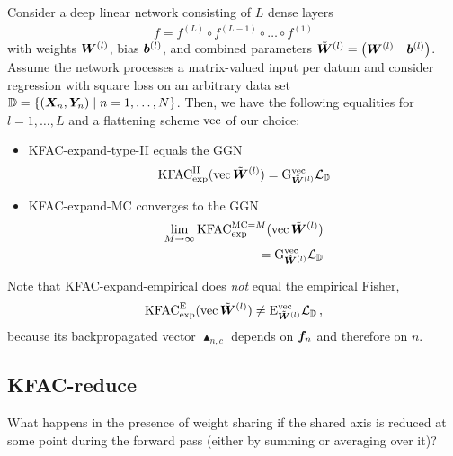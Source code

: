 \begin{test}
  Consider a deep linear network consisting of $L$ dense layers
  \begin{align*}
    f = f^{(L)} \circ f^{(L-1)} \circ \ldots \circ f^{(1)}
  \end{align*}
  with weights $\mW^{(l)}$, bias $\vb^{(l)}$, and combined parameters $\tilde{\mW}^{(l)} = \begin{pmatrix} \mW^{(l)} & \vb^{(l)} \end{pmatrix}$.
  Assume the network processes a matrix-valued input per datum and consider regression with square loss on an arbitrary data set $\sD = \{ (\mX_n, \mY_n) \mid n = 1, \dots, N \}$.
  Then, we have the following equalities for $l = 1, \dots, L$ and a flattening scheme $\vec$ of our choice:
  \begin{itemize}
  \item KFAC-expand-type-II equals the GGN
    \begin{align*}
      \kfac^{\text{II}}_{\text{exp}}(\vec \tilde{\mW}^{(l)})
      =
      \ggn^{\vec}_{\tilde{\mW}^{(l)}} \gL_{\sD}
    \end{align*}
  \item KFAC-expand-MC converges to the GGN
    \begin{align*}
      \lim_{M \to \infty} \kfac^{\text{MC}=M}_{\text{exp}}(\vec \tilde{\mW}^{(l)})
      \\=
      \ggn^{\vec}_{\tilde{\mW}^{(l)}} \gL_{\sD}
    \end{align*}

  \end{itemize}
  Note that KFAC-expand-empirical does \emph{not} equal the empirical Fisher,
  \begin{align*}
    \kfac_{\text{exp}}^{\text{E}}(\vec \tilde{\mW}^{(l)})
    \neq
    \ef^{\vec}_{\tilde{\mW}^{(l)}} \gL_{\sD}\,,
  \end{align*}
  because its backpropagated vector $\blacktriangle_{n,c}$ depends on $\vf_n$ and therefore on $n$.
\end{test}

\subsection{KFAC-reduce}
What happens in the presence of weight sharing if the shared axis is reduced at some point during the forward pass (either by summing or averaging over it)?

